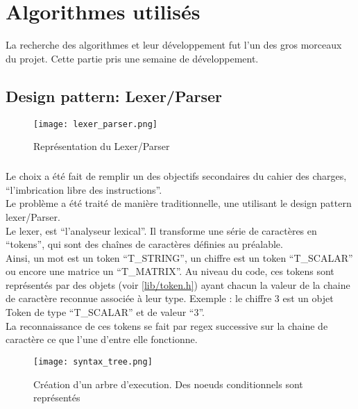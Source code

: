 \chapter{Algorithmes utilisés}
    La recherche des algorithmes et leur développement fut l'un des gros morceaux du projet. Cette partie pris une semaine de développement.

    \section{Design pattern: Lexer/Parser}
        \begin{figure}[h]
            \begin{center}
                \texttt{[image: lexer\_parser.png]}
            \end{center}

            \caption{Représentation du Lexer/Parser}
            \label{Représentation du Lexer/Parser}
        \end{figure}

        \paragraph{}
            Le choix a été fait de remplir un des objectifs secondaires du cahier des charges, ``l'imbrication libre des instructions''.
            \\ Le problème a été traité de manière traditionnelle, une utilisant le design pattern lexer/Parser.
            \\ Le lexer, est ``l'analyseur lexical''. Il transforme une série de caractères en ``tokens'', qui sont des chaînes de caractères définies au préalable.
            \\ Ainsi, un mot est un token ``T\_STRING'', un chiffre est un token ``T\_SCALAR'' ou encore une matrice un ``T\_MATRIX''. Au niveau du code, ces tokens sont représentés par des objets (voir \ref{lib/token.h}) ayant chacun la valeur de la chaine de caractère reconnue associée à leur type. Exemple : le chiffre 3 est un objet Token de type ``T\_SCALAR'' et de valeur ``3''.
            \\ La reconnaissance de ces tokens se fait par regex successive sur la chaine de caractère ce que l'une d'entre elle fonctionne.
      
            \begin{figure}[h]
                \begin{center}
                    \texttt{[image: syntax\_tree.png]}
                \end{center}

                \caption{Création d'un arbre d'execution. Des noeuds conditionnels sont représentés}
                \label{Représentation arbre syntaxique}
            \end{figure}

